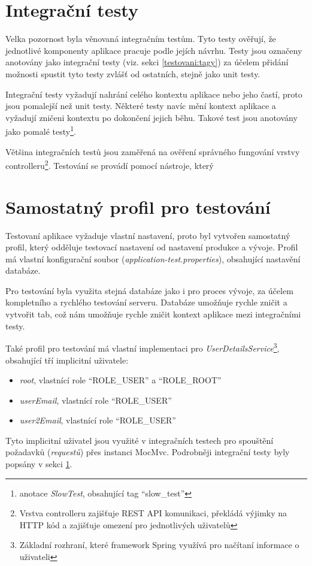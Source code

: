 \section{Integrační testy}\label{testovani:intergacni}
    Velka pozornost byla věnovaná integračním testům. Tyto testy ověřují, že jednotlivé komponenty aplikace pracuje podle jejích návrhu. Testy jsou označeny anotovány jako integrační testy (viz. sekci \ref{testovani:tagy}) za účelem přidání možnosti spustit tyto testy zvlášť od ostatních, stejně jako unit testy. 
    
    Integrační testy vyžadují nahrání celého kontextu aplikace nebo jeho častí, proto jsou pomalejší než unit testy. Některé testy navíc mění kontext aplikace a vyžadují zničeni kontextu po dokončení jejich běhu. Takové test jsou anotovány jako pomalé testy\footnote{anotace \textit{SlowTest}, obsahující tag \enquote{slow\_test}}.
    
    Většina integračních testů jsou zaměřená na ověření správného fungování vrstvy controlleru\footnote{Vrstva controlleru zajišťuje REST API komunikaci, překládá výjimky na HTTP kód a zajišťuje omezení pro jednotlivých uživatelů}. Testování se provádí pomocí nástroje, který 
    
\section{Samostatný profil pro testování}

    Testovaní aplikace vyžaduje vlastní nastavení, proto byl vytvořen samostatný profil, který odděluje testovací nastavení od nastavení produkce a vývoje. Profil má vlastní konfigurační soubor (\textit{application-test.properties}), obsahující nastavění databáze.
    
    Pro testování byla  využita stejná databáze jako i pro proces vývoje, za účelem kompletního a rychlého testování serveru. Databáze umožňuje rychle zničit a vytvořit tab, což nám umožňuje rychle zničit kontext aplikace mezi integračními testy.
    
    Také profil pro testování má vlastní implementaci pro \textit{UserDetailsService}\footnote{Základní rozhraní, které framework Spring využívá pro načítaní informace o uživateli}, obsahující tří implicitní uživatele:
    \begin{itemize}
            \item \textit{root}, vlastnící role \enquote{ROLE\_USER} a \enquote{ROLE\_ROOT} 
            \item \textit{userEmail}, vlastnící role \enquote{ROLE\_USER}
            \item \textit{user2Email}, vlastnící role \enquote{ROLE\_USER}
    \end{itemize}
    Tyto implicitní uživatel jsou využité v integračních testech pro spouštění požadavků (\textit{requestů}) přes instanci MocMvc. Podrobněji integrační testy byly popsány v sekci \ref{testovani:intergacni}.
    
